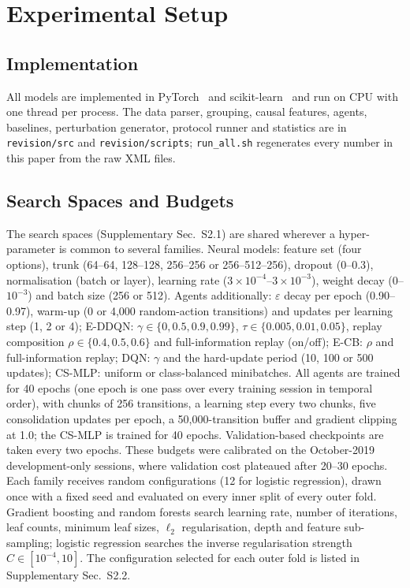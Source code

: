 \section{Experimental Setup}
\label{sec:setup}

\subsection{Implementation}
All models are implemented in PyTorch~\cite{paszke2019pytorch} and scikit-learn~\cite{pedregosa2011sklearn} and run on CPU with one thread per process. The data parser, grouping, causal features, agents, baselines, perturbation generator, protocol runner and statistics are in \texttt{revision/\allowbreak src} and \texttt{revision/\allowbreak scripts}; \texttt{run\_all.sh} regenerates every number in this paper from the raw XML files.

\subsection{Search Spaces and Budgets}
The search spaces (Supplementary Sec.~S2.1) are shared wherever a hyper-parameter is common to several families. Neural models: feature set (four options), trunk (64--64, 128--128, 256--256 or 256--512--256), dropout (0--0.3), normalisation (batch or layer), learning rate ($3\times10^{-4}$--$3\times10^{-3}$), weight decay (0--$10^{-3}$) and batch size (256 or 512). Agents additionally: $\varepsilon$ decay per epoch (0.90--0.97), warm-up (0 or 4,000 random-action transitions) and updates per learning step (1, 2 or 4); E-DDQN: $\gamma\in\{0,0.5,0.9,0.99\}$, $\tau\in\{0.005,0.01,0.05\}$, replay composition $\rho\in\{0.4,0.5,0.6\}$ and full-information replay (on/off); E-CB: $\rho$ and full-information replay; DQN: $\gamma$ and the hard-update period (10, 100 or 500 updates); CS-MLP: uniform or class-balanced minibatches. All agents are trained for 40 epochs (one epoch is one pass over every training session in temporal order), with chunks of 256 transitions, a learning step every two chunks, five consolidation updates per epoch, a 50,000-transition buffer and gradient clipping at 1.0; the CS-MLP is trained for 40 epochs. Validation-based checkpoints are taken every two epochs. These budgets were calibrated on the October-2019 development-only sessions, where validation cost plateaued after 20--30 epochs. Each family receives \HPOBudget{} random configurations (12 for logistic regression), drawn once with a fixed seed and evaluated on every inner split of every outer fold. Gradient boosting and random forests search learning rate, number of iterations, leaf counts, minimum leaf sizes, $\ell_2$ regularisation, depth and feature sub-sampling; logistic regression searches the inverse regularisation strength $C\in[10^{-4},10]$. The configuration selected for each outer fold is listed in Supplementary Sec.~S2.2.

